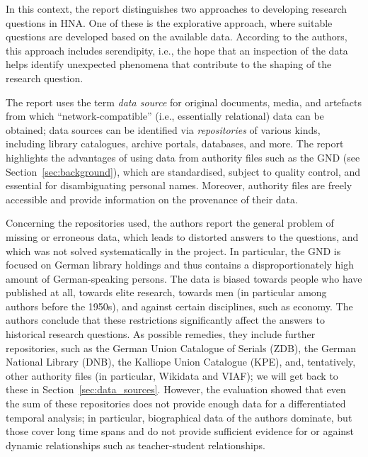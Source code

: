 In this context, the report distinguishes two approaches to developing research questions
in HNA. One of these is the explorative approach,
where suitable questions are developed based on the available data.
According to the authors, this approach includes serendipity,
i.e., the hope that an inspection of the data helps identify unexpected
phenomena that contribute to the shaping of the research question.

The report uses the term \emph{data source} for original documents, media, and artefacts
from which \enquote{network-compatible} (i.e., essentially relational) data can be obtained;
data sources can be identified via \emph{repositories} of various kinds,
including library catalogues, archive portals, databases, and more.
The report highlights the advantages of using data from authority files
such as the GND (see Section~\ref{sec:background}), which are standardised,
subject to quality control, and essential for disambiguating personal names.
Moreover, authority files are freely accessible and provide information
on the provenance of their data.

Concerning the repositories used,
the authors report the general problem of missing or erroneous data,
which leads to distorted answers to the questions, and which was not solved
systematically in the project. In particular, the GND is focused on German library holdings
and thus contains a disproportionately high amount of German-speaking persons.
The data is biased towards people who have published at all,
towards elite research, towards men (in particular among authors before the 1950s),
and against certain disciplines, such as economy.
The authors conclude that these restrictions significantly affect the answers to
historical research questions. As possible remedies, they include 
further repositories, such as 
the German Union Catalogue of Serials (ZDB),
the German National Library (DNB),
the Kalliope Union Catalogue (KPE),
and, tentatively, other authority files (in particular, Wikidata and VIAF);
we will get back to these in Section~\ref{sec:data_sources}.
However, the evaluation showed that even the sum of these repositories
does not provide enough data for a differentiated temporal
analysis; in particular, biographical data of the authors 
dominate, but those cover long time spans and do not provide sufficient evidence
for or against dynamic relationships such as teacher-student relationships.

